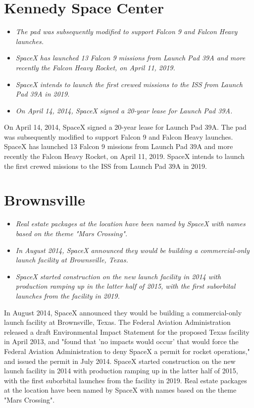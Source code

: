 \section{Kennedy Space Center}\label{kennedy-space-center}

\begin{itemize}
\item
  \emph{The pad was subsequently modified to support Falcon 9 and Falcon
  Heavy launches.}
\item
  \emph{SpaceX has launched 13 Falcon 9 missions from Launch Pad 39A and
  more recently the Falcon Heavy Rocket, on April 11, 2019.}
\item
  \emph{SpaceX intends to launch the first crewed missions to the ISS
  from Launch Pad 39A in 2019.}
\item
  \emph{On April 14, 2014, SpaceX signed a 20-year lease for Launch Pad
  39A.}
\end{itemize}

On April 14, 2014, SpaceX signed a 20-year lease for Launch Pad 39A. The
pad was subsequently modified to support Falcon 9 and Falcon Heavy
launches. SpaceX has launched 13 Falcon 9 missions from Launch Pad 39A
and more recently the Falcon Heavy Rocket, on April 11, 2019. SpaceX
intends to launch the first crewed missions to the ISS from Launch Pad
39A in 2019.

\section{Brownsville}\label{brownsville}

\begin{itemize}
\item
  \emph{Real estate packages at the location have been named by SpaceX
  with names based on the theme "Mars Crossing".}
\item
  \emph{In August 2014, SpaceX announced they would be building a
  commercial-only launch facility at Brownsville, Texas.}
\item
  \emph{SpaceX started construction on the new launch facility in 2014
  with production ramping up in the latter half of 2015, with the first
  suborbital launches from the facility in 2019.}
\end{itemize}

In August 2014, SpaceX announced they would be building a
commercial-only launch facility at Brownsville, Texas. The Federal
Aviation Administration released a draft Environmental Impact Statement
for the proposed Texas facility in April 2013, and "found that 'no
impacts would occur' that would force the Federal Aviation
Administration to deny SpaceX a permit for rocket operations," and
issued the permit in July 2014. SpaceX started construction on the new
launch facility in 2014 with production ramping up in the latter half of
2015, with the first suborbital launches from the facility in 2019. Real
estate packages at the location have been named by SpaceX with names
based on the theme "Mars Crossing".

